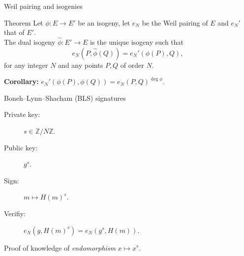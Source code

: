\documentclass[aspectratio=169]{beamer}
\begin{document}

\begin{frame}{Weil pairing and isogenies}
  \centering
  
  \begin{block}{Theorem}
    Let \emph{$ϕ:E→E'$} be an isogeny, let \emph{$e_N$} be the Weil
    pairing of $E$ and \emph{$e_N'$} that of $E'$.\\
    The dual isogeny \emph{$\hat{ϕ}:E'→E$} is the unique isogeny such that
    \[e_N(P,\hat{ϕ}(Q)) = e_N'(ϕ(P),Q),\]
    for any integer $N$ and any points $P,Q$ of order $N$.

    \bigskip
    \textbf{Corollary:} \hfill$e_N'(ϕ(P),ϕ(Q)) = e_N(P,Q)^{\deg ϕ}$.\hfill\strut
  \end{block}
\end{frame}


\begin{frame}{Boneh--Lynn--Shacham (BLS) signatures}
  \begin{block}{}
    \begin{description}
    \item[Private key:] $s∈ℤ/Nℤ$.
    \item[Public key:] $g^s$.
    \item[Sign:] $m ↦ H(m)^s$.
    \item[Verifiy:] $e_N(g,H(m)^s) = e_N(g^s,H(m))$.
    \end{description}
  \end{block}

  \begin{center}
  \end{center}
  
  Proof of knowledge of \emph{endomorphism} $x\mapsto x^s$.
\end{frame}
\end{document}
